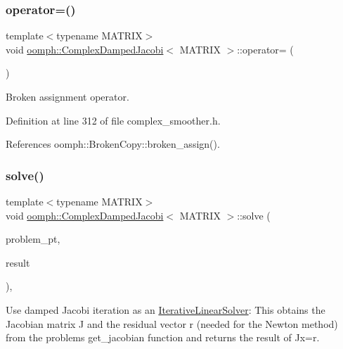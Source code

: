 \subsubsection{\texorpdfstring{operator=()}{operator=()}}
{\footnotesize\ttfamily template$<$typename M\+A\+T\+R\+IX$>$ \\
void \hyperlink{classoomph_1_1ComplexDampedJacobi}{oomph\+::\+Complex\+Damped\+Jacobi}$<$ M\+A\+T\+R\+IX $>$\+::operator= (\begin{DoxyParamCaption}\item[{const \hyperlink{classoomph_1_1ComplexDampedJacobi}{Complex\+Damped\+Jacobi}$<$ M\+A\+T\+R\+IX $>$ \&}]{ }\end{DoxyParamCaption})\hspace{0.3cm}{\ttfamily [inline]}}



Broken assignment operator. 



Definition at line 312 of file complex\+\_\+smoother.\+h.



References oomph\+::\+Broken\+Copy\+::broken\+\_\+assign().

\mbox{\label{classoomph_1_1ComplexDampedJacobi_ab9267bcbaf8435303190a1c12dbb7c2b}} 
\subsubsection{\texorpdfstring{solve()}{solve()}}
{\footnotesize\ttfamily template$<$typename M\+A\+T\+R\+IX$>$ \\
void \hyperlink{classoomph_1_1ComplexDampedJacobi}{oomph\+::\+Complex\+Damped\+Jacobi}$<$ M\+A\+T\+R\+IX $>$\+::solve (\begin{DoxyParamCaption}\item[{\hyperlink{classoomph_1_1Problem}{Problem} $\ast$const \&}]{problem\+\_\+pt,  }\item[{\hyperlink{classoomph_1_1DoubleVector}{Double\+Vector} \&}]{result }\end{DoxyParamCaption})\hspace{0.3cm}{\ttfamily [inline]}, {\ttfamily [virtual]}}



Use damped Jacobi iteration as an \hyperlink{classoomph_1_1IterativeLinearSolver}{Iterative\+Linear\+Solver}\+: This obtains the Jacobian matrix J and the residual vector r (needed for the Newton method) from the problem\textquotesingle{}s get\+\_\+jacobian function and returns the result of Jx=r. 



